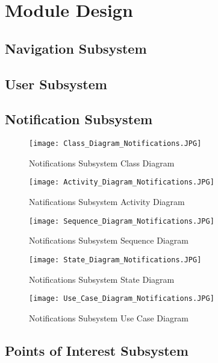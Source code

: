 \documentclass{article}
\begin{document}
		\newpage

		\section{Module Design}\label{sec:moduels}	
			\subsection{Navigation Subsystem}\label{subsec:navigation}
			\subsection{User Subsystem}\label{subsec:users}
			\subsection{Notification Subsystem}\label{subsec:notification}
			
				\begin{figure}[h!]
					\texttt{[image: Class\_Diagram\_Notifications.JPG]}
					\caption{Notifications Subsystem Class Diagram}	
				\end{figure}
			
				\begin{figure}[h!]
					\texttt{[image: Activity\_Diagram\_Notifications.JPG]}
					\caption{Natifications Subsystem Activity Diagram}	
				\end{figure}
				
				\begin{figure}[h!]
					\texttt{[image: Sequence\_Diagram\_Notifications.JPG]}
					\caption{Notifications Subsystem Sequence Diagram}	
				\end{figure}
				
				\begin{figure}[h!]
					\texttt{[image: State\_Diagram\_Notifications.JPG]}
					\caption{Notifications Subsystem State Diagram}	
				\end{figure}
				
				\begin{figure}[h!]
					\texttt{[image: Use\_Case\_Diagram\_Notifications.JPG]}
					\caption{Notifications Subsystem Use Case Diagram}	
				\end{figure}
				
			\subsection{Points of Interest Subsystem}\label{subsec:points of interest}
\end{document}
